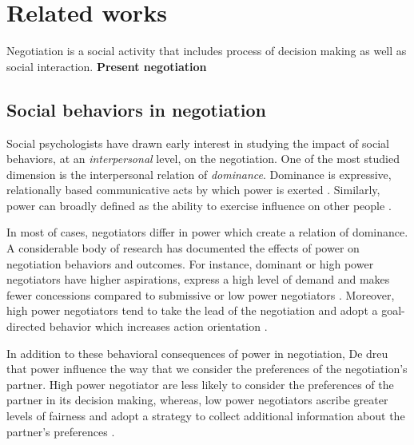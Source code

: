 \documentclass[runningheads,a4paper]{llncs}
\begin{document}
	\section{Related works}	
		Negotiation is a social activity that includes process of decision making as well as social interaction. \textbf{Present negotiation}
		
		\subsection{Social behaviors in negotiation}
			
			Social psychologists have drawn early interest in studying the impact of social behaviors, at an \emph{interpersonal} level, on the negotiation. One of the most studied dimension is the interpersonal relation of \emph{dominance}. Dominance is expressive, relationally based communicative acts by which power is exerted %
			 \cite{burgoonnonverbal}. Similarly,  
			power can broadly defined as the ability to exercise influence on other people \cite{van2006power}.
			
			In most of cases, negotiators differ in power \cite{van2006power} which create a relation of dominance. A considerable body of research has documented the effects of power on negotiation behaviors and outcomes. For instance, dominant or high power negotiators have higher aspirations, express a high level of demand and makes fewer concessions compared to submissive or low power negotiators \cite{de1995impact}. Moreover, high power negotiators tend to take the lead of the negotiation and adopt a goal-directed behavior which increases action orientation \cite{galinsky2003power}.
			
			In addition to these behavioral consequences of power in negotiation, De dreu \cite{de2004influence,fiske1993controlling} that power influence the way that we consider the preferences of the negotiation's partner. High power negotiator are less likely to consider the preferences of the partner in its decision making, whereas, low power negotiators ascribe greater levels of fairness and adopt a strategy to collect additional information about the partner's preferences \cite{de2004influence}.
			
\end{document}
